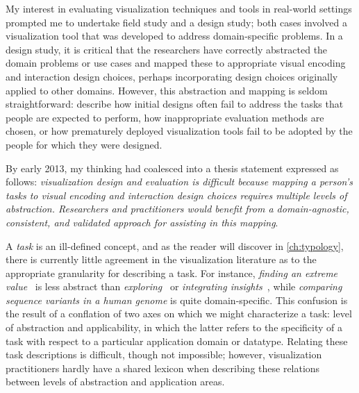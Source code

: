 My interest in evaluating visualization techniques and tools in real-world settings prompted me to undertake field study and a design study; both cases involved a visualization tool that was developed to address domain-specific problems.
In a design study, it is critical that the researchers have correctly abstracted the domain problems or use cases and mapped these to appropriate visual encoding and interaction design choices, perhaps incorporating design choices originally applied to other domains.
However, this abstraction and mapping is seldom straightforward: \citet{Sedlmair2012} describe how initial designs often fail to address the tasks that people are expected to perform, how inappropriate evaluation methods are chosen, or how prematurely deployed visualization tools fail to be adopted by the people for which they were designed.

By early 2013, my thinking had coalesced into a thesis statement expressed as follows: {\it visualization design and evaluation is difficult because mapping a person's tasks to visual encoding and interaction design choices requires multiple levels of abstraction. 
Researchers and practitioners would benefit from a domain-agnostic, consistent, and validated approach for assisting in this mapping}.

A {\it task} is an ill-defined concept, and as the reader will discover in \autoref{ch:typology}, there is currently little agreement in the visualization literature as to the appropriate granularity for describing a task.
For instance, {\it finding an extreme value}~\cite{Amar2005} is less abstract than {\it exploring}~\cite{Yi2007} or {\it integrating insights}~\cite{Springmeyer1992}, while {\it comparing sequence variants in a human genome} is quite domain-specific.
This confusion is the result of a conflation of two axes on which we might characterize a task: level of abstraction and applicability, in which the latter refers to the specificity of a task with respect to a particular application domain or datatype.
Relating these task descriptions is difficult, though not impossible; however, visualization practitioners hardly have a shared lexicon when describing these relations between levels of abstraction and application areas.

